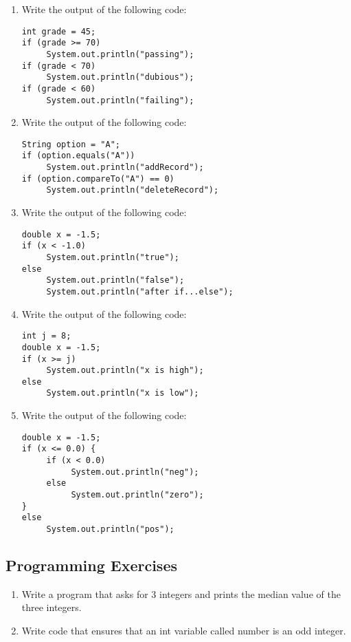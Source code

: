 \begin{enumerate}[label={\arabic{counter}\addtocounter{counter}{1}}.]
\item Write the output of the following code:
\begin{lstlisting}
int grade = 45;
if (grade >= 70)
     System.out.println("passing");
if (grade < 70)
     System.out.println("dubious");
if (grade < 60)
     System.out.println("failing");
\end{lstlisting}

\item Write the output of the following code:
\begin{lstlisting}
String option = "A";
if (option.equals("A"))
     System.out.println("addRecord");
if (option.compareTo("A") == 0)
     System.out.println("deleteRecord");
\end{lstlisting}

\item Write the output of the following code:
\begin{lstlisting}
double x = -1.5;
if (x < -1.0)
     System.out.println("true");
else
     System.out.println("false");
     System.out.println("after if...else");
\end{lstlisting}

\item Write the output of the following code:
\begin{lstlisting}
int j = 8;
double x = -1.5;
if (x >= j)
     System.out.println("x is high");
else
     System.out.println("x is low");
\end{lstlisting}

\item Write the output of the following code:
\begin{lstlisting}
double x = -1.5;
if (x <= 0.0) {
     if (x < 0.0)
          System.out.println("neg");
     else
          System.out.println("zero");
}
else
     System.out.println("pos");
\end{lstlisting}

\end{enumerate}

\subsection{Programming Exercises}

\setcounter{counter}{1}
\begin{enumerate}[label={\arabic{counter}\addtocounter{counter}{1}}.]

\item Write a program that asks for 3 integers and prints the median value of the three integers.

\item Write code that ensures that an int variable called number is an odd integer.

\end{enumerate}